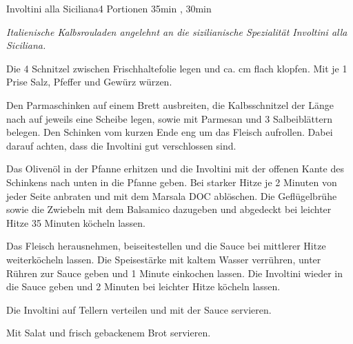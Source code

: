 \documentclass[../recipe-collections/cooking.tex]{subfiles}
\begin{document}
\begin{recipe}{Involtini alla Siciliana}{4 Portionen }{35min , 30min }

  \freeform{}\textit{Italienische Kalbsrouladen angelehnt an die sizilianische Spezialität Involtini alla Siciliana.}


  Die 4 Schnitzel zwischen Frischhaltefolie legen und ca.  cm flach klopfen.
  Mit je 1 Prise Salz, Pfeffer und Gewürz würzen.


  Den Parmaschinken auf einem Brett ausbreiten, die Kalbsschnitzel der Länge nach auf jeweils eine Scheibe legen, sowie mit Parmesan und 3 Salbeiblättern belegen.
  Den Schinken vom kurzen Ende eng um das Fleisch aufrollen.
  Dabei darauf achten, dass die Involtini gut verschlossen sind.


  Das Olivenöl in der Pfanne erhitzen und die Involtini mit der offenen Kante des Schinkens nach unten in die Pfanne geben.
  Bei starker Hitze je 2 Minuten von jeder Seite anbraten und mit dem Marsala DOC ablöschen.
  Die Geflügelbrühe sowie die Zwiebeln mit dem Balsamico dazugeben und abgedeckt bei leichter Hitze 35 Minuten köcheln lassen.


  Das Fleisch herausnehmen, beiseitestellen und die Sauce bei mittlerer Hitze weiterköcheln lassen.
  Die Speisestärke mit kaltem Wasser verrühren, unter Rühren zur Sauce geben und 1 Minute einkochen lassen.
  Die Involtini wieder in die Sauce geben und 2 Minuten bei leichter Hitze köcheln lassen.

  \newstep{}Die Involtini auf Tellern verteilen und mit der Sauce servieren.

  \freeform{}\hrulefill{}

  \freeform{}
  Mit Salat und frisch gebackenem Brot servieren.

\end{recipe}
\end{document}

